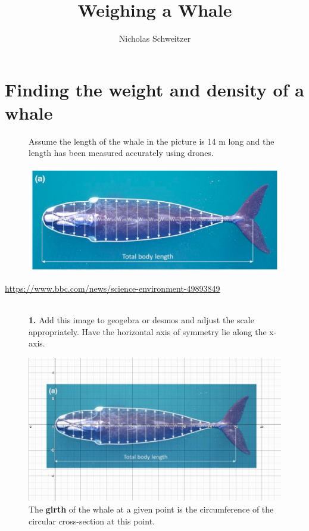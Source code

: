 \documentclass[fleqn]{article}
\title{\Huge Weighing a Whale}
\author{Nicholas Schweitzer}
\date{}
\begin{document}
\maketitle

\section{Finding the weight and density of a whale}

\begin{figure}[H]
  Assume the length of the whale in the picture is 14 m long and the length has been measured accurately using drones.

  \includegraphics{whale_with_distances.png}
\end{figure}

\href{https://www.bbc.com/news/science-environment-49893849}{https://www.bbc.com/news/science-environment-49893849}
\\\\

\begin{figure}[H]
  \textbf{1.} Add this image to geogebra or desmos and adjust the scale appropriately. Have the horizontal axis of symmetry lie along the x-axis.

  \includegraphics[scale=0.4]{desmos-whale.png}
  The \textbf{girth} of the whale at a given point is the circumference of the circular cross-section at this point.
\end{figure}
\end{document}
